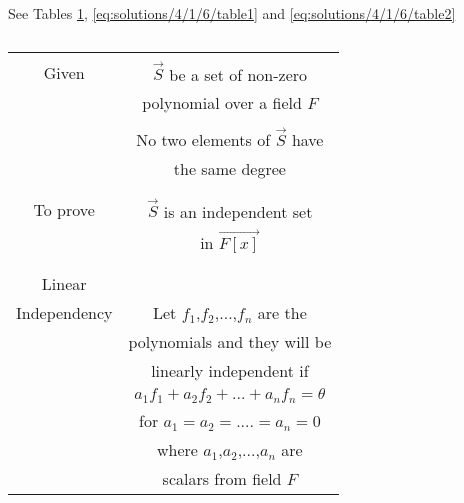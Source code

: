 See Tables 
\ref{eq:solutions/4/1/6/table0},
\ref{eq:solutions/4/1/6/table1} and 
\ref{eq:solutions/4/1/6/table2}

\begin{table}[ht!]
\begin{center}
\begin{tabular}{|c|c|}
\hline
& \\
Given & $\vec{S}$ be a set of non-zero\\
& polynomial over a field $F$\\
& \\
& No two elements of $\vec{S}$ have\\
& the same degree\\
& \\
\hline
& \\
To prove & $\vec{S}$ is an independent set\\
& in $\vec{F[x]}$\\
& \\
\hline
& \\
Linear &\\
Independency  & Let $f_1$,$f_2$,...,$f_n$ are the\\
& polynomials and they will be \\
& linearly independent if\\
& $a_1f_1+a_2f_2+...+a_nf_n=\theta$ \\
& for $a_1=a_2=....=a_n=0$ \\
& where $a_1$,$a_2$,...,$a_n$ are \\
& scalars from field $F$\\
\hline
\end{tabular}
\end{center}
\caption{}
\label{eq:solutions/4/1/6/table0}
\end{table}


